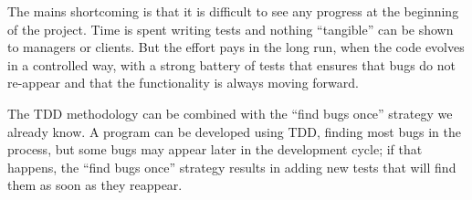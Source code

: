 The mains shortcoming is that it is difficult to see any progress at
the beginning of the project. Time is spent writing tests and nothing
``tangible'' can be shown to managers or clients. But the effort pays
in the long run, when the code evolves in a controlled way, with a
strong battery of tests that ensures that bugs do not re-appear and
that the functionality is always moving forward. 

The TDD methodology can be combined with the ``find bugs once'' strategy
we already know. A program can be developed using TDD, finding most
bugs in the process, but some bugs may appear later in the development
cycle; if that happens, the ``find bugs once'' strategy results in
adding new tests that will find them as soon as they reappear.


